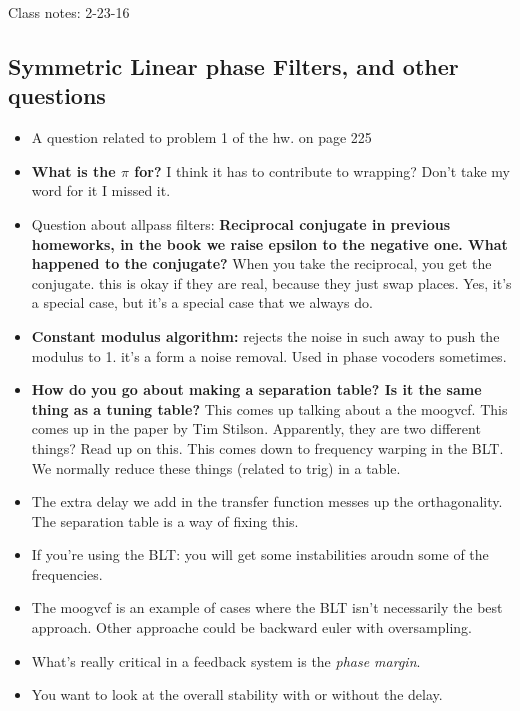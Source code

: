 Class notes: 2-23-16

\subsection*{Symmetric Linear phase Filters, and other questions}

\begin{itemize}
    \item{A question related to problem 1 of the hw. on page 225}
    \item{
        \textbf{What is the $\pi$ for?} I think it has to contribute to 
wrapping? Don't take my word for it I missed it.
    }
    \item{
        Question about allpass filters: \textbf{Reciprocal conjugate in 
        previous homeworks, in the book we raise
        epsilon to the negative one.  What happened to the conjugate?} When you 
        take the reciprocal, you get the conjugate.  this is okay if they are real, 
        because they just swap places. Yes, it's a special case, but it's a special 
        case that we always do.
    }
    \item{
        \textbf{Constant modulus algorithm:} rejects the noise in such away to push the modulus to 1. 
        it's a form a noise removal. Used in phase vocoders sometimes. 
    }
    \item{ 
        \textbf{How do you go about making a separation table? 
        Is it the same thing as a tuning table?} 
        This comes up talking about a the moogvcf. This comes up in the paper by Tim Stilson.
        Apparently, they are two different things? Read up on this. 
        This comes down to frequency warping in the BLT. We normally reduce these things 
        (related to trig) in a table.
    }
    \item{ The extra delay we add in the transfer function messes up the orthagonality. The
     separation table is a way of fixing this. }
    \item{ If you're using the BLT: you will get some instabilities aroudn some of the frequencies.  }
    \item{ The moogvcf is an example of cases where the BLT isn't necessarily the best approach. 
        Other approache could be backward euler with oversampling. 
    }
    \item{
        What's really critical in a feedback system is the \textit{phase margin}.
    }
    \item{
        You want to look at the overall stability with or without the delay. 
    }
\end{itemize}

